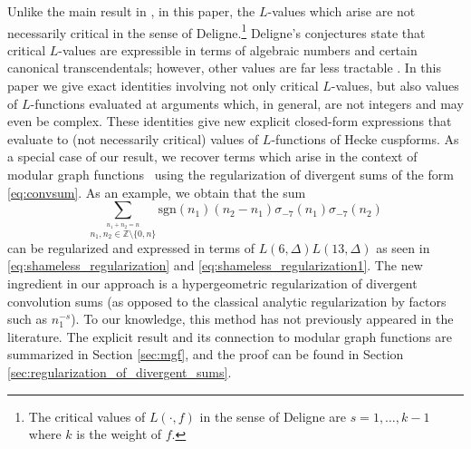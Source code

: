 \documentclass[]{article}
\begin{document}
Unlike the  main result in \cite{FKLR}, in this paper, the $L$-values which arise are not necessarily critical in the sense of Deligne.\footnote{ The critical values of $L(\cdot, f)$ in the sense of Deligne \cite{kontsevich2001periods} are $s=1, \ldots, k-1$ where $k$ is the weight of $f$.}  Deligne's conjectures state that critical $L$-values are expressible in terms of
algebraic numbers and certain canonical  transcendentals; however, other values are far less tractable \cite{kontsevich2001periods, diamantis2020kernels}.
In this paper we give exact identities involving not only critical $L$-values, but also values of $L$-functions evaluated at arguments which, in general, are not integers and may even be complex. These identities give new explicit closed-form expressions that evaluate to (not necessarily critical) values of 
$L$-functions of Hecke cuspforms. As a special case of our result, %
we recover terms which arise in the context of modular graph functions~\cite{DKS2021_2} using the regularization of divergent sums of the form \eqref{eq:convsum}.
As an example, we obtain that the  sum  
\begin{equation}
    \sum_{\stackrel{n_1+n_2=n}{n_1, n_2 \in \mathbb{Z} \setminus \{ 0, n\}  } } \text{sgn}(n_1) \left(n_2-n_1\right)\sigma_{-7}(n_1) \sigma_{-7}(n_2) 
\end{equation}
can be regularized and expressed in terms of $L(6,\Delta) L(13, \Delta)$ as seen in \eqref{eq:shameless_regularization} and \eqref{eq:shameless_regularization1}. 
The new ingredient in our approach is a hypergeometric regularization of divergent convolution sums (as opposed to the classical analytic regularization by factors such as $n_1^{-s}$). To our knowledge, this method has not previously appeared in the literature. The explicit result and its connection to modular graph functions are summarized in Section \ref{sec:mgf}, and the proof can be found in Section \ref{sec:regularization_of_divergent_sums}.

 
\end{document}
